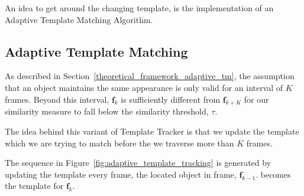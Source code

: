 An idea to get around the changing template, is the implementation of an
Adaptive Template Matching Algorithm.

\subsection{Adaptive Template Matching}\label{results_adaptive_template_matching}
As described in Section~\ref{theoretical_framework_adaptive_tm}, the assumption
that an object maintains the same appearance is only valid for an interval of
$K$ frames. Beyond this interval, $\mathbf{f}_{k}$ is sufficiently different
from $\mathbf{f}_{k+K}$ for our similarity measure to fall below the similarity
threshold, $\tau$.

The idea behind this variant of Template Tracker is that we update the
template which we are trying to match before the we traverse more than
$K$ frames.

The sequence in Figure~\ref{fig:adaptive_template_tracking} is generated by
updating the template every frame, the located object in frame,
$\mathbf{f}_{k-1}$. becomes the template for $\mathbf{f}_k$.


